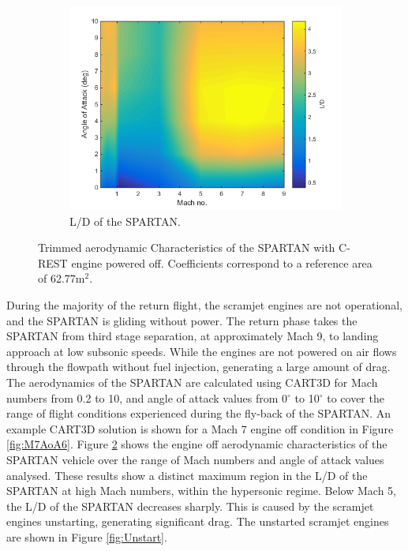 \begin{figure}[ht]
\begin{subfigure}{.5\textwidth}
		\includegraphics[width=0.99\linewidth]{figures/3_vehicle_design/LD}
		\caption{L/D of the SPARTAN.}
		\label{fig:LD}
	\end{subfigure}
	\caption{Trimmed aerodynamic Characteristics of the SPARTAN with C-REST engine powered off. Coefficients correspond to a reference area of 62.77m$^2$.}
	\label{fig:aero1}
\end{figure}

During the majority of the return flight, the scramjet engines are not operational, and the SPARTAN is gliding without power. The return phase takes the SPARTAN from third stage separation, at approximately Mach 9, to landing approach at low subsonic speeds. 
 While the engines are not powered on air flows through the flowpath without fuel injection, generating a large amount of drag. 
The aerodynamics of the SPARTAN are calculated using CART3D for Mach numbers from 0.2 to 10, and angle of attack values from 0$^\circ$ to 10$^\circ$ to cover the range of flight conditions experienced during the fly-back of the SPARTAN.  An example CART3D solution is shown for a Mach 7 engine off condition in Figure  \ref{fig:M7AoA6}. 
Figure \ref{fig:aero1} shows the engine off aerodynamic characteristics of the SPARTAN vehicle over the range of Mach numbers and angle of attack values analysed.
These results show a distinct maximum region in the L/D of the SPARTAN at high Mach numbers, within the hypersonic regime. Below Mach 5, the L/D of the SPARTAN decreases sharply. This is caused by the scramjet engines unstarting, generating significant drag. The unstarted scramjet engines are shown in Figure \ref{fig:Unstart}.

